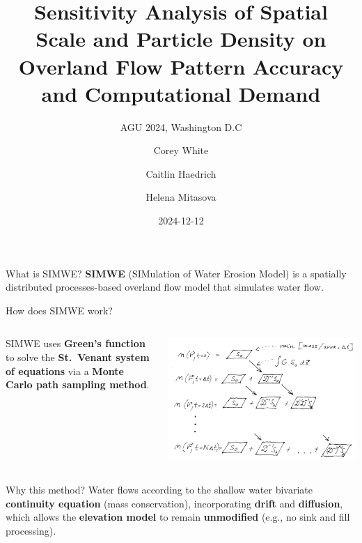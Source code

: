 \documentclass[
  ignorenonframetext,
]{beamer}
\title{Sensitivity Analysis of Spatial Scale and Particle Density on
Overland Flow Pattern Accuracy and Computational Demand}
\subtitle{AGU 2024, Washington D.C}
\author{Corey White \and Caitlin Haedrich \and Helena Mitasova}
\date{2024-12-12}
\begin{document}
\frame{\titlepage}


\begin{frame}{What is SIMWE?}
\label{what-is-simwe}
\textbf{SIMWE} (SIMulation of Water Erosion Model) is a spatially
distributed processes-based overland flow model that simulates water
flow.

\begin{block}{How does SIMWE work?}
\label{how-does-simwe-work}
\begin{columns}[T]
\begin{column}{0.6\textwidth}
SIMWE uses \textbf{Green's function} to solve the \textbf{St.~Venant
system of equations} via a \textbf{Monte Carlo path sampling method}.
\end{column}

\begin{column}{0.4\textwidth}
\includegraphics{images/evolfig.jpg}
\end{column}
\end{columns}
\end{block}
\end{frame}

\begin{frame}{Why this method?}
\label{why-this-method}
Water flows according to the shallow water bivariate \textbf{continuity
equation} (mass conservation), incorporating \textbf{drift} and
\textbf{diffusion}, which allows the \textbf{elevation model} to remain
\textbf{unmodified} (e.g., no sink and fill processing).
\end{frame}
\end{document}
